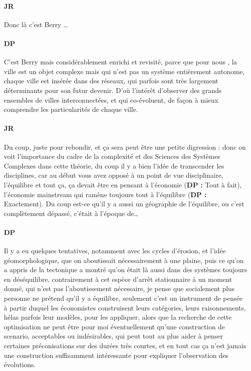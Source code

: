\documentclass[12pt]{article}
\begin{document}
\paragraph{JR} Donc là c'est Berry \ldots

\paragraph{DP}

C'est Berry mais considérablement enrichi et revisité, parce que pour nous , la ville est un objet complexe mais qui n'est pas un système entièrement autonome, chaque ville est insérée dans des réseaux, qui parfois sont très largement déterminants pour son futur devenir. D'où l'intérêt d'observer des grands ensembles de villes interconnectées, et qui co-évoluent, de façon à mieux comprendre les particularités de chaque ville.

\paragraph{JR}

Du coup, juste pour rebondir, et ça sera peut être une petite digression : donc on voit l'importance du cadre de la complexité et des Sciences des Systèmes Complexes dans cette théorie, du coup il y a bien l'idée de transcender les disciplines, car au début vous avez opposé à un point de vue disciplinaire, l'équilibre et tout ça, ça devait être en pensant à l'économie (\textbf{DP : } Tout à fait), l'économie mainstream qui ramène toujours tout à l'équilibre (\textbf{DP : }Exactement). Du coup est-ce qu'il y a aussi un géographie de l'équilibre, ou c'est complètement dépassé, c'était à l'époque de\ldots

\paragraph{DP}

Il y a eu quelques tentatives, notamment avec les cycles d'érosion, et l'idée géomorphologique, que on aboutissait nécessairement à une plaine, puis ce qu'on a appris de la tectonique a montré qu'on était là aussi dans des systèmes toujours en déséquilibre, contrairement à cet espèce d'arrêt stationnaire à un moment donné, qui n'est pas l'aboutissement nécessaire, je pense que socialement plus personne ne prétend qu'il y a équilibre, seulement c'est un instrument de pensée à partir duquel les économistes construisent leurs catégories, leurs raisonnements, hélas parfois leur modèles, pour les appliquer, alors que la recherche de cette optimisation ne peut être pour moi éventuellement qu'une construction de scenario, acceptables ou indésirables, qui peut tout au plus aider à penser certaines préconisations sur des durées très courtes, et en tout cas ça n'est jamais une construction suffisamment intéressante pour expliquer l'observation des évolutions.
\end{document}
